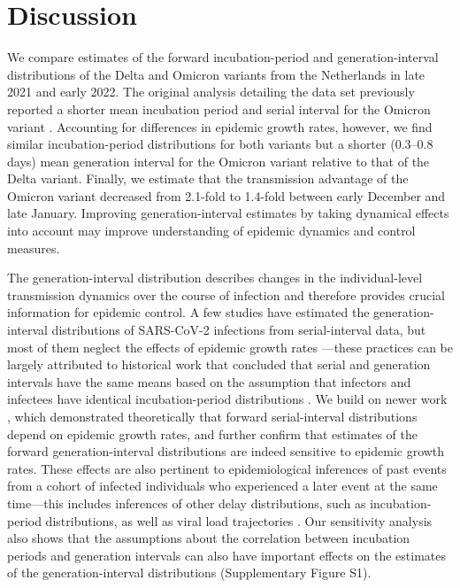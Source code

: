 \documentclass[12pt]{article}
\begin{document}
\section{Discussion}

We compare estimates of the forward incubation-period and generation-interval distributions of the Delta and Omicron variants from the Netherlands in late 2021 and early 2022.
The original analysis detailing the data set previously reported a shorter mean incubation period and serial interval for the Omicron variant \citep{backer2021omicron}.
Accounting for differences in epidemic growth rates, however, we find similar incubation-period distributions for both variants but a shorter (0.3--0.8 days) mean generation interval for the Omicron variant relative to that of the Delta variant.
Finally, we estimate that the transmission advantage of the Omicron variant decreased from 2.1-fold to 1.4-fold between early December and late January.
Improving generation-interval estimates by taking dynamical effects into account may improve understanding of epidemic dynamics and control measures.

The generation-interval distribution describes changes in the individual-level transmission dynamics over the course of infection and therefore provides crucial information for epidemic control.
A few studies have estimated the generation-interval distributions of SARS-CoV-2 infections from serial-interval data, but most of them neglect the effects of epidemic growth rates \citep{ganyani2020estimating,he2020temporal,zhao2021estimating,hart2022generation}---these practices can be largely attributed to historical work that concluded that serial and generation intervals have the same means based on the assumption that infectors and infectees have identical incubation-period distributions \citep{svensson2007note,britton2019estimation,lehtinen2021relationship}.
We build on newer work \citep{park2021forward}, which demonstrated theoretically that forward serial-interval distributions depend on epidemic growth rates, and further confirm that estimates of the forward generation-interval distributions are indeed sensitive to epidemic growth rates.
These effects are also pertinent to epidemiological inferences of past events from a cohort of infected individuals who experienced a later event at the same time---this includes inferences of other delay distributions, such as incubation-period distributions, as well as viral load trajectories \citep{hay2021estimating}.
Our sensitivity analysis also shows that the assumptions about the correlation between incubation periods and generation intervals can also have important effects on the estimates of the generation-interval distributions (Supplementary Figure S1).
\end{document}
